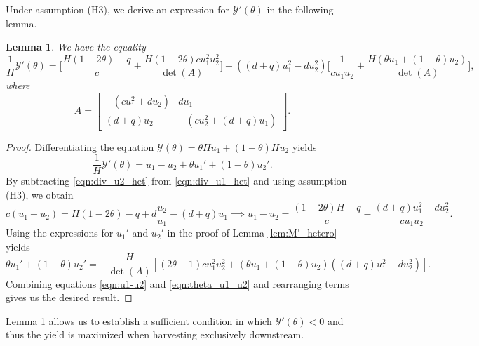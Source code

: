 \documentclass[11pt]{article}
\newtheorem{lemma}[theorem]{Lemma}
\def\YY{\mathcal{Y}}
\theoremstyle{definition}
\begin{document}
Under assumption (H3), we derive an expression for $\YY'(\theta)$ in the following lemma.

\begin{lemma}\label{lem:Y'}
We have the equality
\[
\frac{1}{H}\YY'(\theta)=\bigg[\frac{H(1-2\theta)-q}{c}+ \frac{H(1-2\theta)cu_1^2u_2^2}{\det(A)}\bigg]- ((d+q)u_1^2-du_2^2)\bigg[\frac{1}{cu_1u_2}+\frac{H(\theta u_1+(1-\theta)u_2)}{\det(A)}\bigg],
\]
where 
\begin{equation}\label{matrix A_hom}
A=\begin{bmatrix}
    -(cu_1^2+du_2) & du_1\\
    (d+q)u_2 & -(cu_2^2+(d+q)u_1)
\end{bmatrix}.
\end{equation}


\end{lemma}
\begin{proof}
Differentiating the equation $\YY(\theta)=\theta Hu_1+(1-\theta)Hu_2$ yields
\[
\frac{1}{H}\YY'(\theta)= u_1-u_2 + \theta u_1' +(1-\theta)u_2'.
\]
By subtracting \eqref{eqn:div_u2_het} from \eqref{eqn:div_u1_het} and using assumption (H3), we obtain
\begin{equation}\label{eqn:u1-u2}
    c(u_1-u_2)=H(1-2\theta)-q +d\frac{u_2}{u_1} - (d+q)u_1 \implies u_1-u_2=\frac{(1-2\theta)H-q}{c} - \frac{(d+q)u_1^2-du_2^2}{cu_1u_2}.
\end{equation}
Using the expressions for $u_1'$ and $u_2'$ in the proof of Lemma \ref{lem:M'_hetero} yields
\begin{equation}\label{eqn:theta_u1_u2}
    \theta u_1' +(1-\theta)u_2'= - \frac{H}{\det(A)}[(2\theta-1)cu_1^2u_2^2+ (\theta u_1+(1-\theta)u_2)((d+q)u_1^2-du_2^2)].
\end{equation}
Combining equations \eqref{eqn:u1-u2} and \eqref{eqn:theta_u1_u2} and rearranging terms gives us the desired result.
\end{proof}


Lemma \ref{lem:Y'} allows us to establish a sufficient condition in which $\YY'(\theta)<0$ and thus the yield is maximized when harvesting exclusively downstream.
\end{document}
